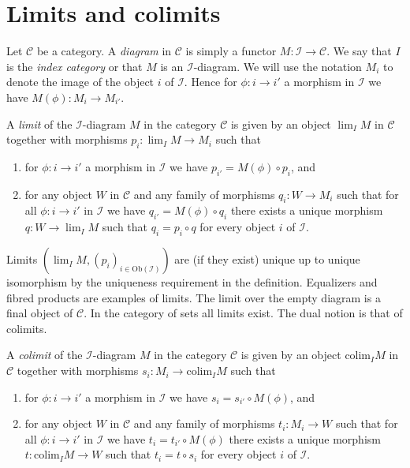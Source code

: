 \section{Limits and colimits}
\label{section-limits}

\noindent
Let $\mathcal{C}$ be a category. A {\it diagram} in $\mathcal{C}$ is
simply a functor $M : \mathcal{I} \to \mathcal{C}$. We say that
$I$ is the {\it index category} or that $M$ is an $\mathcal{I}$-diagram.
We will use the notation $M_i$ to denote the image of the object
$i$ of $\mathcal{I}$. Hence for $\phi : i \to i'$ a morphism
in $\mathcal{I}$ we have $M(\phi) : M_i \to M_{i'}$.

\begin{definition}
\label{definition-limit}
A {\it limit} of the $\mathcal{I}$-diagram $M$ in the category
$\mathcal{C}$ is given by an object $\lim_I M$ in $\mathcal{C}$
together with morphisms $p_i : \lim_I M \to M_i$ such that
\begin{enumerate}
\item for $\phi : i \to i'$ a morphism
in $\mathcal{I}$ we have $p_{i'} =  M(\phi) \circ p_i$, and
\item for any object $W$ in $\mathcal{C}$ and any family of
morphisms $q_i : W \to M_i$ such that for all $\phi : i \to i'$
in $\mathcal{I}$ we have $q_{i'} = M(\phi) \circ q_i$ there 
exists a unique morphism $q : W \to \lim_I M$ such that
$q_i = p_i \circ q$ for every object $i$ of $\mathcal{I}$.
\end{enumerate}
\end{definition}

\noindent
Limits $(\lim_I M, (p_i)_{i\in \text{Ob}(\mathcal{I})})$ are
(if they exist)
unique up to unique isomorphism by the uniqueness requirement
in the definition. Equalizers and fibred products are examples
of limits. The limit over the empty diagram is a final object
of $\mathcal{C}$.
In the category of sets all limits exist.
The dual notion is that of colimits.

\begin{definition}
\label{definition-colimit}
A {\it colimit} of the $\mathcal{I}$-diagram $M$ in the category
$\mathcal{C}$ is given by an object $\text{colim}_I M$ in $\mathcal{C}$
together with morphisms $s_i : M_i \to \text{colim}_I M$ such that
\begin{enumerate}
\item for $\phi : i \to i'$ a morphism
in $\mathcal{I}$ we have $s_{i} = s_{i'} \circ M(\phi)$, and
\item for any object $W$ in $\mathcal{C}$ and any family of
morphisms $t_i : M_i \to W$ such that for all $\phi : i \to i'$
in $\mathcal{I}$ we have $t_{i} = t_{i'} \circ M(\phi)$ there 
exists a unique morphism $t : \text{colim}_I M \to W$ such that
$t_i = t \circ s_i$ for every object $i$ of $\mathcal{I}$.
\end{enumerate}
\end{definition}

